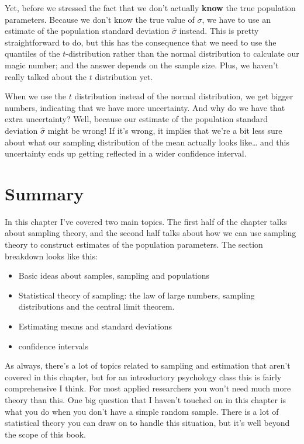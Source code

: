 \documentclass[
]{book}
\begin{document}
Yet, before we stressed the fact that we don't actually \textbf{know} the true population parameters. Because we don't know the true value of \(\sigma\), we have to use an estimate of the population standard deviation \(\hat{\sigma}\) instead. This is pretty straightforward to do, but this has the consequence that we need to use the quantiles of the \(t\)-distribution rather than the normal distribution to calculate our magic number; and the answer depends on the sample size. Plus, we haven't really talked about the \(t\) distribution yet.

When we use the \(t\) distribution instead of the normal distribution, we get bigger numbers, indicating that we have more uncertainty. And why do we have that extra uncertainty? Well, because our estimate of the population standard deviation \(\hat\sigma\) might be wrong! If it's wrong, it implies that we're a bit less sure about what our sampling distribution of the mean actually looks like\ldots{} and this uncertainty ends up getting reflected in a wider confidence interval.

\hypertarget{summary}{%
\section{Summary}\label{summary}}

In this chapter I've covered two main topics. The first half of the chapter talks about sampling theory, and the second half talks about how we can use sampling theory to construct estimates of the population parameters. The section breakdown looks like this:

\begin{itemize}
\item
  Basic ideas about samples, sampling and populations
\item
  Statistical theory of sampling: the law of large numbers, sampling distributions and the central limit theorem.
\item
  Estimating means and standard deviations
\item
  confidence intervals
\end{itemize}

As always, there's a lot of topics related to sampling and estimation that aren't covered in this chapter, but for an introductory psychology class this is fairly comprehensive I think. For most applied researchers you won't need much more theory than this. One big question that I haven't touched on in this chapter is what you do when you don't have a simple random sample. There is a lot of statistical theory you can draw on to handle this situation, but it's well beyond the scope of this book.
\end{document}
